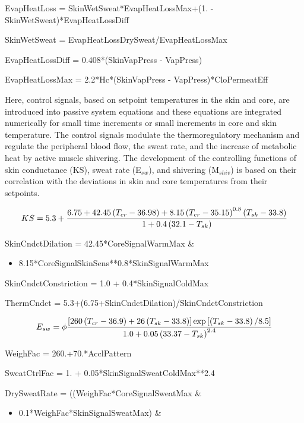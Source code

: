 EvapHeatLoss = SkinWetSweat*EvapHeatLossMax+(1. - SkinWetSweat)*EvapHeatLossDiff

SkinWetSweat = EvapHeatLossDrySweat/EvapHeatLossMax

EvapHeatLossDiff = 0.408*(SkinVapPress - VapPress)

EvapHeatLossMax = 2.2*Hc*(SkinVapPress - VapPress)*CloPermeatEff

Here, control signals, based on setpoint temperatures in the skin and core, are introduced into passive system equations and these equations are integrated numerically for small time increments or small increments in core and skin temperature. The control signals modulate the thermoregulatory mechanism and regulate the peripheral blood flow, the sweat rate, and the increase of metabolic heat by active muscle shivering. The development of the controlling functions of skin conductance (KS), sweat rate (E\(_{sw}\)), and shivering (M\(_{shiv}\)) is based on their correlation with the deviations in skin and core temperatures from their setpoints.

\begin{equation}
  KS = 5.3 + \frac{6.75+42.45\left(T_{cr}-36.98\right)+8.15\left(T_{cr}-35.15\right)^{0.8}\left(T_{sk}-33.8\right)}{1+0.4\left(32.1-T_{sk}\right)}
\end{equation}

SkinCndctDilation = 42.45*CoreSignalWarmMax \&

\begin{itemize}
\tightlist
\item
  8.15*CoreSignalSkinSens**0.8*SkinSignalWarmMax
\end{itemize}

SkinCndctConstriction = 1.0 + 0.4*SkinSignalColdMax

ThermCndct = 5.3+(6.75+SkinCndctDilation)/SkinCndctConstriction

\begin{equation}
  E_{sw} = \phi \frac{\left[260\left(T_{cr} - 36.9\right) + 26\left(T_{sk} - 33.8\right)\right] \exp\left[\left(T_{sk} - 33.8\right)/8.5\right]}{1.0 + 0.05\left(33.37 - T_{sk}\right)^{2.4}}
\end{equation}

WeighFac = 260.+70.*AcclPattern

SweatCtrlFac = 1. + 0.05*SkinSignalSweatColdMax**2.4

DrySweatRate = ((WeighFac*CoreSignalSweatMax \&

\begin{itemize}
\tightlist
\item
  0.1*WeighFac*SkinSignalSweatMax) \&
\end{itemize}

